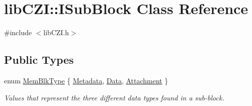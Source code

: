 \hypertarget{classlib_c_z_i_1_1_i_sub_block}{}\section{lib\+C\+ZI\+:\+:I\+Sub\+Block Class Reference}
\label{classlib_c_z_i_1_1_i_sub_block}


{\ttfamily \#include $<$lib\+C\+Z\+I.\+h$>$}

\subsection*{Public Types}
\begin{DoxyCompactItemize}
\item 
enum \hyperlink{classlib_c_z_i_1_1_i_sub_block_a4dc4926ea65d8d20310b8b79ea76e108}{Mem\+Blk\+Type} \{ \hyperlink{classlib_c_z_i_1_1_i_sub_block_a4dc4926ea65d8d20310b8b79ea76e108ada66dacad65a36fd265a7a2dacae197c}{Metadata}, 
\hyperlink{classlib_c_z_i_1_1_i_sub_block_a4dc4926ea65d8d20310b8b79ea76e108ad89f4242d3c09c1ef3302841226d240d}{Data}, 
\hyperlink{classlib_c_z_i_1_1_i_sub_block_a4dc4926ea65d8d20310b8b79ea76e108ab60de398d6a7a2fe1c4c9585572b3ef1}{Attachment}
 \}\begin{DoxyCompactList}\small\item\em Values that represent the three different data types found in a sub-\/block. \end{DoxyCompactList}
\end{DoxyCompactItemize}

